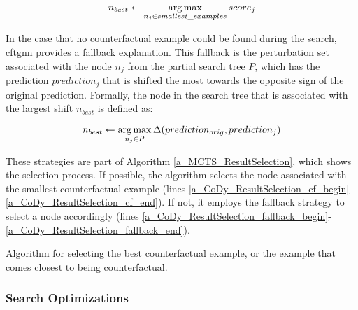 \begin{equation}
    n_{best} \gets \operatorname*{arg\,max}_{n_j \in smallest\_examples} score_j
\end{equation}

In the case that no counterfactual example could be found during the search, \gls{cftgnn} provides a fallback explanation. 
This fallback is the perturbation set associated with the node $n_j$ from the partial search tree $P$, which has the prediction $prediction_j$ that is shifted the most towards the opposite sign of the original prediction. Formally, the node in the search tree that is associated with the largest shift $n_{best}$ is defined as:

\begin{equation}
    n_{best} \gets \operatorname*{arg\,max}_{n_j \in P} \Delta(prediction_{orig}, prediction_j)
\end{equation}

These strategies are part of Algorithm \ref{a_MCTS_ResultSelection}, which shows the selection process. If possible, the algorithm selects the node associated with the smallest counterfactual example (lines \ref{a_CoDy_ResultSelection_cf_begin}-\ref{a_CoDy_ResultSelection_cf_end}). If not, it employs the fallback strategy to select a node accordingly (lines \ref{a_CoDy_ResultSelection_fallback_begin}-\ref{a_CoDy_ResultSelection_fallback_end}).

{
\setlength{\algomargin}{1.25em}
\small
\begin{algorithm}[ht]
\caption{Algorithm for selecting the best counterfactual example, or the example that comes closest to being counterfactual.}
\label{a_MCTS_ResultSelection}
\end{algorithm}
}

\FloatBarrier
\subsubsection{Search Optimizations}
\label{s_Methodology_CoDy_Optimizations}


